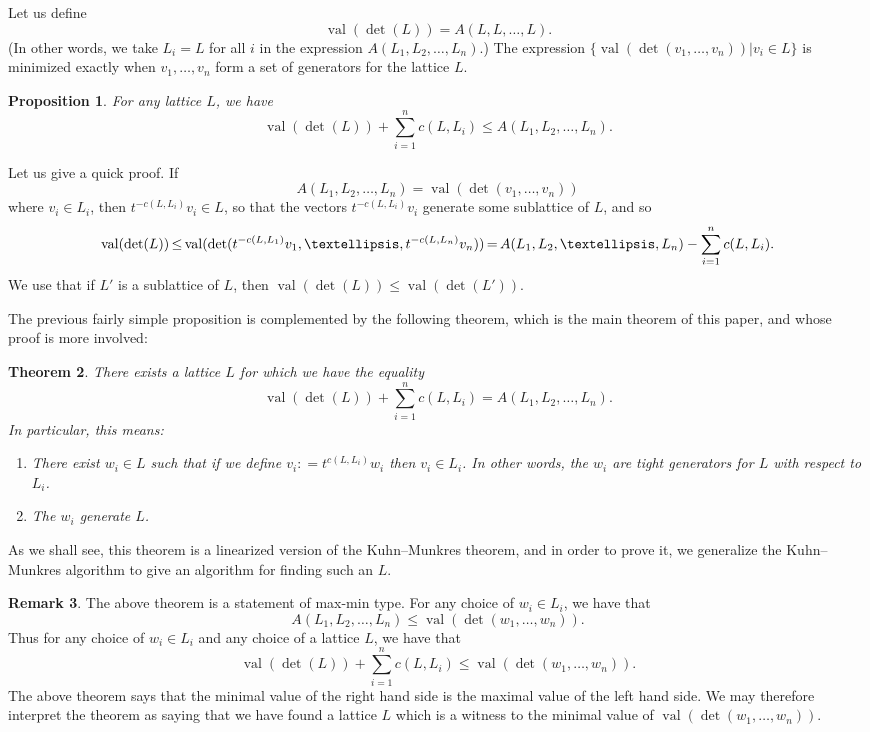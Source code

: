 \documentclass[10pt]{amsart}
\newtheorem{theorem}{Theorem}[section]
\newtheorem{prop}[theorem]{Proposition}
\theoremstyle{definition}
\newtheorem{rema}[theorem]{Remark}
\newcommand{\val}{\operatorname{val}}
\newcommand*{\Mk}{\mkern -2mu}
\begin{document}
Let us define 
\[
\val(\det(L)) = A(L,L,\dots, L).
\]
(In other words, we take $L_i=L$ for all $i$ in the expression $A(L_1, L_2, \dots, L_n)$.) The expression $\{\val(\det(v_1, \dots, v_n)) | v_i \in L\}$ is minimized exactly when $v_1, \dots, v_n$ form a set of generators for the lattice $L$.

\begin{prop} For any lattice $L$, we have
\[
\val(\det(L)) + \sum_{i=1}^n c(L,L_i) \leq A(L_1, L_2, \dots, L_n).
\]
\end{prop}
Let us give a quick proof. If
\[
A(L_1, L_2, \dots, L_n) = \val(\det(v_1, \dots, v_n))
\]
where $v_i \in L_i$, then $t^{-c(L,L_i)}v_i \in L$, so that the vectors $t^{-c(L,L_i)}v_i$ generate some sublattice of $L$, and so
\[
\val(\det(L)) \Mk \leq \Mk \val(\det(t^{-c(L,L_1)}v_1, \dots, t^{-c(L,L_n)}v_n)) \Mk = \Mk A(L_1, L_2, \dots, L_n) - \sum_{i=1}^n c(L,L_i).
\]
We use that if $L'$ is a sublattice of $L$, then $\val(\det(L)) \leq \val(\det(L'))$.

The previous fairly simple proposition is complemented by the following theorem, which is the main theorem of this paper, and whose proof is more involved:

\begin{theorem} \label{main} There exists a lattice $L$ for which we have the equality
\[
\val(\det(L)) + \sum_{i=1}^n c(L,L_i) = A(L_1, L_2, \dots, L_n).
\]
In particular, this means: 
\begin{enumerate}
\item There exist $w_i \in L$ such that if we define $v_i : = t^{c(L,L_i)} w_i$ then $v_i \in L_i$. In other words, the $w_i$ are tight generators for $L$ with respect to $L_i$.
\item The $w_i$ generate $L$.
\end{enumerate}
\end{theorem}

As we shall see, this theorem is a linearized version of the Kuhn--Munkres theorem, and in order to prove it, we generalize the Kuhn--Munkres algorithm to give an algorithm for finding such an $L$.

\begin{rema} The above theorem is a statement of max-min type. For any choice of $w_i \in L_i$, we have that 
\[
A(L_1, L_2, \dots, L_n) \leq \val(\det(w_1, \dots, w_n)).
\]
Thus for any choice of $w_i \in L_i$ and any choice of a lattice $L$, we have that
\[
\val(\det(L)) + \sum_{i=1}^n c(L,L_i) \leq \val(\det(w_1, \dots, w_n)).
\]
The above theorem says that the minimal value of the right hand side is the maximal value of the left hand side. We may therefore interpret the theorem as saying that we have found a lattice $L$ which is a witness to the minimal value of $\val(\det(w_1, \dots, w_n)).$
\end{rema}
\end{document}
